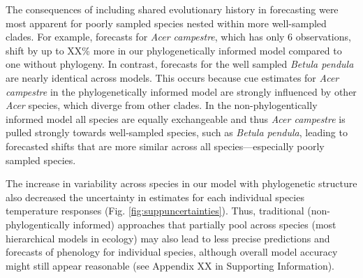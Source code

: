 \documentclass[11pt]{article}
\begin{document}
The consequences of including shared evolutionary history in forecasting were most apparent for poorly sampled species nested within more well-sampled clades. For example, forecasts for \emph{Acer campestre}, which has only 6 observations, shift by up to XX\% more in our phylogenetically informed model compared to one without phylogeny. In contrast, forecasts for the well sampled  \emph{Betula pendula} are nearly identical across models. This occurs because cue estimates for \emph{Acer campestre} in the phylogenetically informed model are strongly influenced by other \emph{Acer} species, which diverge from other clades. In the non-phylogentically informed model all species are equally exchangeable and thus \emph{Acer campestre} is pulled strongly towards well-sampled species, such as \emph{Betula pendula}, leading to forecasted shifts that are more similar across all species---especially poorly sampled species. 

The increase in variability across species in our model with phylogenetic structure also decreased the uncertainty in estimates for each individual species temperature responses (Fig. \ref{fig:suppuncertainties}). Thus, traditional (non-phylogentically informed) approaches that partially pool across species (most hierarchical models in ecology) may also lead to less precise predictions and forecasts of phenology for individual species, although overall model accuracy might still appear reasonable (see Appendix XX in Supporting Information).

\end{document}
